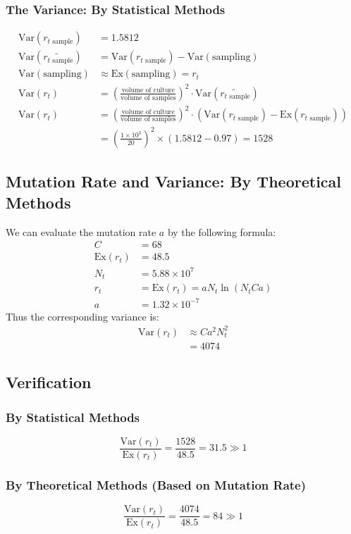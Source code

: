 \documentclass[UTF-8]{article}
\begin{document}
\subsubsection{The Variance: By Statistical Methods}
\begin{align}
    \text{Var}(r_{t\text{ sample}})&=1.5812\\
    \text{Var}(\tilde{r_{t \text{ sample}}})&=\text{Var}(r_{t \text{ sample}})-\text{Var}(\text{sampling})\\
    \text{Var}(\text{sampling})&\approx\text{Ex}(\text{sampling})=r_t\\
    \text{Var}({r_t})&=\left( \frac{\text{volume of culture}}{\text{volume of samples}} \right)^2\cdot\text{Var}(\tilde{r_{t \text{ sample}}}) \\
    \text{Var}({r_t})&=\left( \frac{\text{volume of culture}}{\text{volume of samples}} \right)^2\cdot(\text{Var}(r_{t \text{ sample}}) -\text{Ex}(r_{t \text{ sample}}))\\
    &=\left(\frac{1\times 10^3}{20}\right)^2\times(1.5812-0.97)=1528
\end{align}
\subsection{Mutation Rate and Variance: By Theoretical Methods}
We can evaluate the mutation rate $a$ by the following formula:
\begin{align}
    C &= 68\\
    \text{Ex}(r_{t})&=48.5 \\
    N_t&=5.88\times 10^7\\
    r_t&=\text{Ex}(r_t)=aN_t\ln(N_tCa)  \\
    a&=1.32\times 10^{-7} 
\end{align}
Thus the corresponding variance is:
\begin{align}
    \text{Var}({r_t})&\approx Ca^2N_t^2\\
    &=4074
\end{align}

\subsection{Verification}
\subsubsection{By Statistical Methods}
$$
\frac{\text{Var}(r_t)}{\text{Ex}(r_t)}=\frac{1528}{48.5}=31.5 \gg 1
$$
\subsubsection{By Theoretical Methods (Based on Mutation Rate)}
$$
\frac{\text{Var}(r_t)}{\text{Ex}(r_t)}=\frac{4074}{48.5}=84 \gg 1
$$
\end{document}
